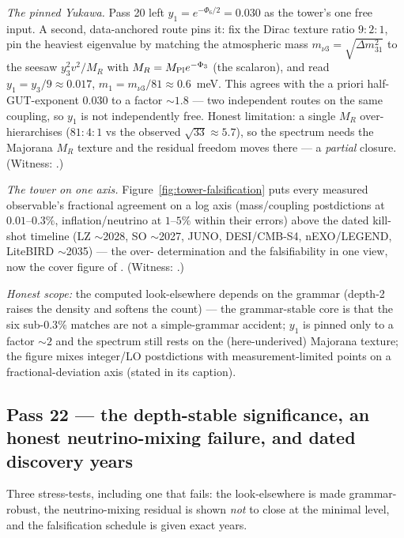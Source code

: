 \documentclass[11pt]{article}
\begin{document}
\emph{The pinned Yukawa.} Pass 20 left $y_1=e^{-\Phi_6/2}=0.030$ as the tower's one free input.
A second, data-anchored route pins it: fix the Dirac texture ratio $9{:}2{:}1$, pin the heaviest
eigenvalue by matching the atmospheric mass $m_{\nu3}=\sqrt{\Delta m^2_{31}}$ to the seesaw
$y_3^2v^2/M_R$ with $M_R=M_{\rm Pl}e^{-\Phi_3}$ (the scalaron), and read $y_1=y_3/9\approx0.017$,
$m_1=m_{\nu3}/81\approx0.6$~meV. This agrees with the a priori half-GUT-exponent $0.030$ to a
factor $\sim1.8$ --- two independent routes on the same coupling, so $y_1$ is not independently
free. Honest limitation: a single $M_R$ over-hierarchises ($81{:}4{:}1$ vs the observed
$\sqrt{33}\approx5.7$), so the spectrum needs the Majorana $M_R$ texture and the residual freedom
moves there --- a \emph{partial} closure. (Witness: .)

\emph{The tower on one axis.} Figure~\ref{fig:tower-falsification} puts every measured observable's
fractional agreement on a log axis (mass/coupling postdictions at $0.01$--$0.3\%$,
inflation/neutrino at $1$--$5\%$ within their errors) above the dated kill-shot timeline (LZ
$\sim$2028, SO $\sim$2027, JUNO, DESI/CMB-S4, nEXO/LEGEND, LiteBIRD $\sim$2035) --- the over-
determination and the falsifiability in one view, now the cover figure of .
(Witness: .)



\emph{Honest scope:} the computed look-elsewhere depends on the grammar (depth-2 raises the
density and softens the count) --- the grammar-stable core is that the six sub-$0.3\%$ matches are
not a simple-grammar accident; $y_1$ is pinned only to a factor $\sim2$ and the spectrum still
rests on the (here-underived) Majorana texture; the figure mixes integer/LO postdictions with
measurement-limited points on a fractional-deviation axis (stated in its caption).

\subsection{Pass 22 --- the depth-stable significance, an honest neutrino-mixing failure, and dated discovery years}
\label{sec:capstone-twentytwo}

Three stress-tests, including one that fails: the look-elsewhere is made grammar-robust, the
neutrino-mixing residual is shown \emph{not} to close at the minimal level, and the falsification
schedule is given exact years.
\end{document}
